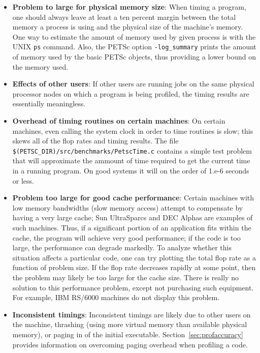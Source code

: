 \begin{itemize}
\item {\bf Problem to large for physical memory size}: When timing a program, one
      should always leave at least a ten percent margin between the total
      memory a process is using and the physical size of 
      the machine's memory. One way to estimate the amount of 
      memory used by given process is with the UNIX {\tt ps} command.
      Also, the PETSc option {\tt -log\_summary} prints the amount of 
      memory used by the basic PETSc objects, thus providing a lower
      bound on the memory used.
\item {\bf Effects of other users}:  If other users are running
      jobs on the same physical processor nodes on which a program is being profiled,
      the timing results are essentially meaningless. 
\item {\bf Overhead of timing routines on certain machines}: On certain machines,
      even calling the system clock in order to time routines is 
      slow; this skews all of the flop rates and timing results. The file
      {\tt \$(PETSC\_DIR)/src/benchmarks/PetscTime.c} contains a
      simple test problem that will approximate the ammount of time
      required to get the current time in a running program. On good
      systems it will on the order of 1.e-6 seconds or less.
\item {\bf Problem too large for good cache performance}: Certain machines
      with low memory bandwidths (slow memory access) attempt to 
      compensate by having a very large cache; Sun UltraSparcs and 
      DEC Alphas are examples of such machines.  Thus, if a significant
      portion of an application fits within the cache, the program will achieve very 
      good performance; if the code is too large, the performance can degrade markedly.
      To analyze whether this situation affects a particular code, one can
      try plotting the total flop rate as a function of problem
      size.  If the flop rate decreases rapidly at some point, then the
      problem may likely be too large for the cache size.  There is really
      no solution to this performance problem, except not purchasing such equipment.
      For example, IBM RS/6000 machines do not display this problem.
\item {\bf Inconsistent timings}:  Inconsistent timings are likely due to other
      users on the machine, thrashing (using more virtual memory than available
      physical memory), or paging in of the initial executable.  
      Section~\ref{sec:profaccuracy} provides information on overcoming paging
      overhead when profiling a code.
\end{itemize}

